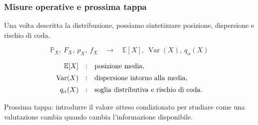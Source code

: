 \documentclass[handout]{beamer}%
\providecommand{\E}{\mathbb{E}}
\providecommand{\Prob}{\mathbb{P}}
\providecommand{\1}{\mathbf{1}}
\providecommand{\Var}{\operatorname{Var}}
\providecommand{\QTR}[2]{\csname #1\endcsname{#2}}
\begin{document}
\begin{frame}%
%

\frametitle{Misure operative e prossima tappa}%


Una volta descritta la distribuzione, possiamo sintetizzare posizione,
dispersione e rischio di coda.

\medskip%

\[
\Prob_{X},\ F_{X},\ p_{X},\ f_{X} \quad\longrightarrow\quad
\E[X],\ \Var(X),\ q_{\alpha}(X)
\]


\medskip%

\[%
\begin{array}
[c]{rcl}%
\E[X] & : & \mbox{posizione media},\\[5pt]%
\Var(X) & : & \mbox{dispersione intorno alla media},\\[5pt]%
q_{\alpha}(X) & : & \mbox{soglia distributiva e rischio di coda}.
\end{array}
\]


\medskip



Prossima tappa: introdurre il valore atteso condizionato per studiare come una
valutazione cambia quando cambia l'informazione disponibile.%

\transboxout
\end{frame}%
\end{document}
